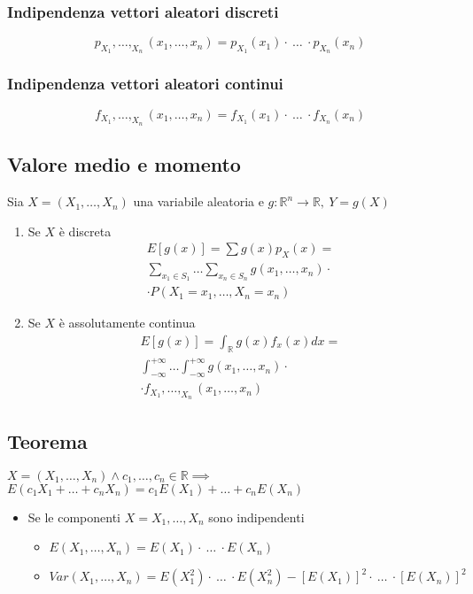\begin{multicols*}{2}
\subsubsection*{Indipendenza vettori aleatori discreti}
$$
p_{X_1},\dots,_{X_n}(x_1,\dots,x_n) = p_{X_1}(x_1) \cdot \ \dots \ \cdot p_{X_n}(x_n)
$$

\subsubsection*{Indipendenza vettori aleatori continui}
$$
f_{X_1},\dots,_{X_n}(x_1,\dots,x_n) = f_{X_1}(x_1) \cdot \ \dots \ \cdot f_{X_n}(x_n)
$$

\subsection*{Valore medio e momento}
Sia $X= (X_1,\dots,X_n)$ una variabile aleatoria e $g: \mathbb{R}^n \to \mathbb{R}, \ Y = g(X)$
\begin{enumerate}
    \item Se $X$ è discreta
    \begin{align*}
    E[g(x)] = \sum g(x)p_X(x) =
    \\\sum_{x_1 \in S_1} \dots \sum_{x_n \in S_n}
    g(x_1,\dots,x_n) \cdot
    \\\cdot P(X_1=x_1,\dots,X_n=x_n)
    \end{align*}
    \item Se $X$ è assolutamente continua
    \begin{align*}
    E[g(x)] = \int_{\mathbb{R}} g(x)f_x(x) dx =
    \\\int_{-\infty}^{+\infty} \dots \int_{-\infty}^{+\infty}
    g(x_1,\dots,x_n) \cdot
    \\\cdot f_{X_1},\dots,_{X_n}(x_1,\dots,x_n)
    \end{align*}
\end{enumerate}

\subsection*{Teorema}
$X = (X_1,\dots,X_n) \land c_1,\dots,c_n \in \mathbb{R} \implies$
$E(c_1 X_1 + \dots + c_n X_n) = c_1 E(X_1) + \dots + c_n E(X_n)$
\begin{itemize}
    \item Se le componenti $X = X_1, \dots, X_n$ sono indipendenti
    \begin{itemize}
        \item $E(X_1,\dots,X_n) = E(X_1) \cdot \ \dots \ \cdot E(X_n)$
        \item $\mathit{Var}(X_1,\dots,X_n) = E(X_1^2) \cdot \ \dots \ \cdot E(X_n^2)
        - [E(X_1)]^2 \cdot \ \dots \ \cdot [E(X_n)]^2
        $
    \end{itemize}
\end{itemize}


\end{multicols*}
